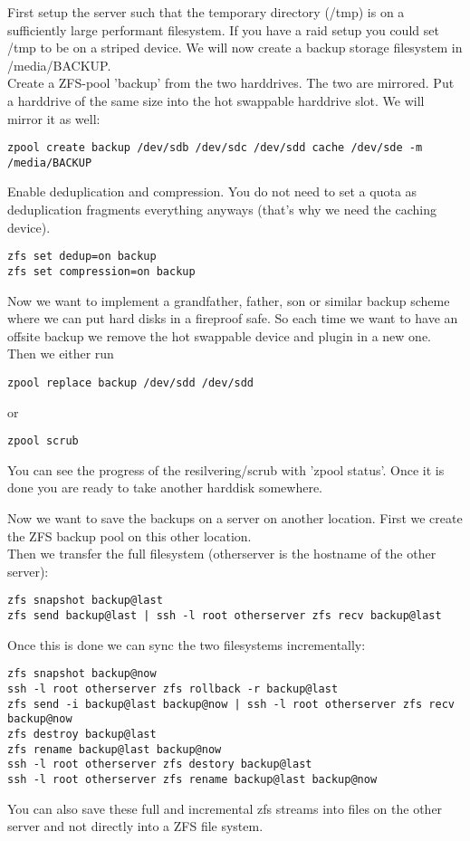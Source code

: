 \documentclass[a4paper,10pt]{article}
\begin{document}
First setup the server such that the temporary directory (/tmp) is on a sufficiently large performant filesystem. If you have a raid setup you could set /tmp to be on a striped device. We will now create a backup storage filesystem in /media/BACKUP.\\
Create a ZFS-pool 'backup' from the two harddrives. The two are mirrored. Put a harddrive of the same size into the hot swappable harddrive slot. We will mirror it as well:
\begin{verbatim}
zpool create backup /dev/sdb /dev/sdc /dev/sdd cache /dev/sde -m /media/BACKUP
\end{verbatim}
Enable deduplication and compression. You do not need to set a quota as deduplication fragments everything anyways (that's why we need the caching device).
\begin{verbatim}
zfs set dedup=on backup
zfs set compression=on backup
\end{verbatim}
Now we want to implement a grandfather, father, son or similar backup scheme where we can put hard disks in a fireproof safe. So each time we want to have an offsite backup we remove the hot swappable device and plugin in a new one. Then we either run
\begin{verbatim}
zpool replace backup /dev/sdd /dev/sdd
\end{verbatim}
or
\begin{verbatim}
zpool scrub
\end{verbatim}
You can see the progress of the resilvering/scrub with 'zpool status'. Once it is done you are ready to take another harddisk somewhere.

Now we want to save the backups on a server on another location. First we create the ZFS backup pool on this other location.\\
Then we transfer the full filesystem (otherserver is the hostname of the other server):
\begin{verbatim}
zfs snapshot backup@last
zfs send backup@last | ssh -l root otherserver zfs recv backup@last
\end{verbatim}
Once this is done we can sync the two filesystems incrementally:
\begin{verbatim}
zfs snapshot backup@now
ssh -l root otherserver zfs rollback -r backup@last
zfs send -i backup@last backup@now | ssh -l root otherserver zfs recv backup@now
zfs destroy backup@last
zfs rename backup@last backup@now
ssh -l root otherserver zfs destory backup@last
ssh -l root otherserver zfs rename backup@last backup@now
\end{verbatim}
You can also save these full and incremental zfs streams into files on the other server and not directly into a ZFS file system.
\end{document}
